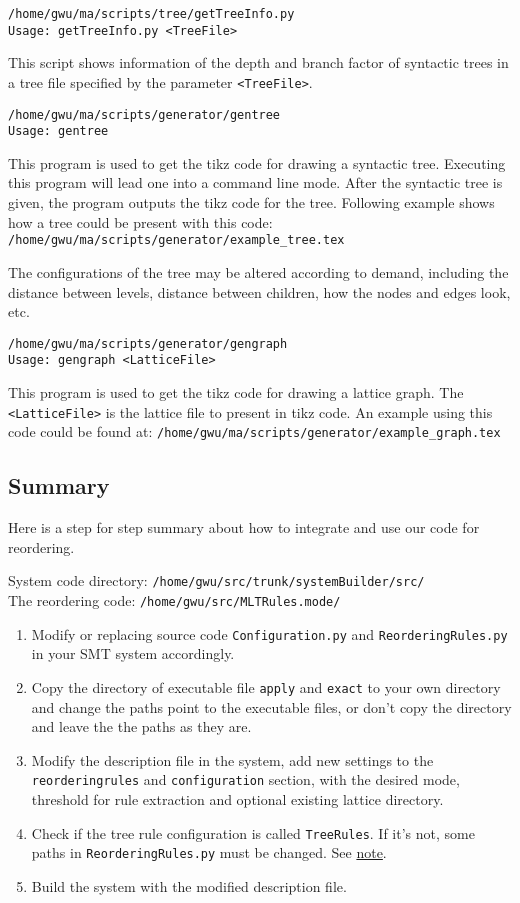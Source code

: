 \verb|/home/gwu/ma/scripts/tree/getTreeInfo.py|\\
\verb|Usage: getTreeInfo.py <TreeFile>|

This script shows information of the depth and branch factor of syntactic trees in a tree file specified by the parameter \verb|<TreeFile>|. 

\verb|/home/gwu/ma/scripts/generator/gentree| \\
\verb|Usage: gentree|

This program is used to get the tikz code for drawing a syntactic tree. Executing this program will lead one into a command line mode. After the syntactic tree is given, the program outputs the tikz code for the tree. Following example shows how a tree could be present with this code:\\
\verb|/home/gwu/ma/scripts/generator/example_tree.tex|

The configurations of the tree may be altered according to demand, including the distance between levels, distance between children, how the nodes and edges look, etc.

\verb|/home/gwu/ma/scripts/generator/gengraph| \\
\verb|Usage: gengraph <LatticeFile>|

This program is used to get the tikz code for drawing a lattice graph. The \verb|<LatticeFile>| is the lattice file to present in tikz code. An example using this code could be found at:
\verb|/home/gwu/ma/scripts/generator/example_graph.tex|
	
\subsection{Summary}
\label{summary}

Here is a step for step summary about how to integrate and use our code for reordering.

System code directory: \verb|/home/gwu/src/trunk/systemBuilder/src/|\\
The reordering code: \verb|/home/gwu/src/MLTRules.mode/|

\begin{enumerate}
\item Modify or replacing source code \verb|Configuration.py| and \verb|ReorderingRules.py| in your SMT system accordingly.
\item Copy the directory of executable file \verb|apply| and \verb|exact| to your own directory and change the paths point to the executable files, or don't copy the directory and leave the the paths as they are.
\item Modify the description file in the system, add new settings to the \verb|reorderingrules| and \verb|configuration| section, with the desired mode, threshold for rule extraction and optional existing lattice directory.
\item Check if the tree rule configuration is called \verb|TreeRules|. If it's not, some paths in \verb|ReorderingRules.py| must be changed. See \hyperref[note]{note}.
\item Build the system with the modified description file.
\end{enumerate}
